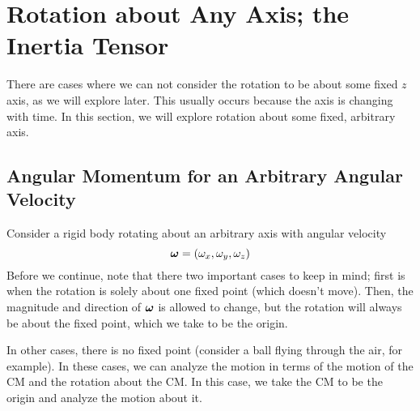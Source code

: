 \section{Rotation about Any Axis; the Inertia Tensor}
There are cases where we can not consider the rotation to be about some fixed $z$ axis, as we will explore later. This usually occurs because the axis is changing with time. In this section, we will explore rotation about some fixed, arbitrary axis.
\subsection*{Angular Momentum for an Arbitrary Angular Velocity}
Consider a rigid body rotating about an arbitrary axis with angular velocity
\[ \boldsymbol{\omega} = (\omega_x, \omega_y, \omega_z)\]
Before we continue, note that there two important cases to keep in mind; first is when the rotation is solely about one fixed point (which doesn't move). Then, the magnitude and direction of $\boldsymbol{\omega}$ is allowed to change, but the rotation will always be about the fixed point, which we take to be the origin.

In other cases, there is no fixed point (consider a ball flying through the air, for example). In these cases, we can analyze the motion in terms of the motion of the CM and the rotation about the CM. In this case, we take the CM to be the origin and analyze the motion about it.

